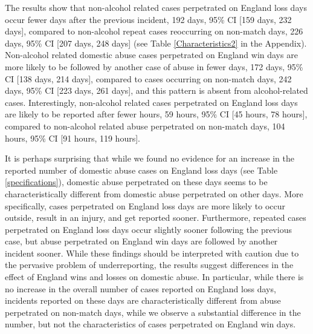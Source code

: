\documentclass[12pt, letterpaper]{article}
\begin{document}
The results show that non-alcohol related cases perpetrated on England loss days occur fewer days after the previous incident, 192 days, 95\% CI [159 days, 232 days], compared to non-alcohol repeat cases reoccurring on non-match days, 226 days, 95\% CI [207 days, 248 days] (see Table \ref{Characteristics2} in the Appendix). Non-alcohol related domestic abuse cases perpetrated on England win days are more likely to be followed by another case of abuse in fewer days, 172 days, 95\% CI [138 days, 214 days], compared to cases occurring on non-match days, 242 days, 95\% CI [223 days, 261 days], and this pattern is absent from alcohol-related cases. Interestingly, non-alcohol related cases perpetrated on England loss days are likely to be reported after fewer hours, 59 hours, 95\% CI [45 hours, 78 hours], compared to non-alcohol related abuse perpetrated on non-match days, 104 hours, 95\% CI [91 hours, 119 hours]. 


It is perhaps surprising that while we found no evidence for an increase in the reported number of domestic abuse cases on England loss days (see Table \ref{specifications}), domestic abuse perpetrated on these days seems to be characteristically different from domestic abuse perpetrated on other days. More specifically, cases perpetrated on England loss days are more likely to occur outside, result in an injury, and get reported sooner. Furthermore, repeated cases perpetrated on England loss days occur slightly sooner following the previous case, but abuse perpetrated on England win days are followed by another incident sooner. While these findings should be interpreted with caution due to the pervasive problem of underreporting, the results suggest differences in the effect of England wins and losses on domestic abuse. In particular, while there is no increase in the overall number of cases reported on England loss days, incidents reported on these days are characteristically different from abuse perpetrated on non-match days, while we observe a substantial difference in the number, but not the characteristics of cases perpetrated on England win days.
\end{document}
